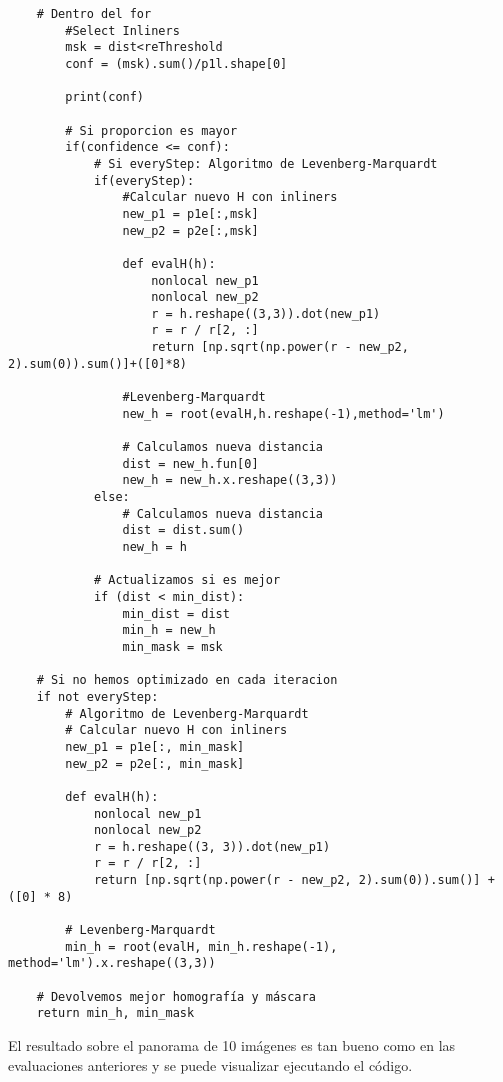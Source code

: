 \documentclass{article}
\begin{document}
\begin{lstlisting}
    # Dentro del for
        #Select Inliners
        msk = dist<reThreshold
        conf = (msk).sum()/p1l.shape[0]

        print(conf)

        # Si proporcion es mayor
        if(confidence <= conf):
            # Si everyStep: Algoritmo de Levenberg-Marquardt
            if(everyStep):
                #Calcular nuevo H con inliners
                new_p1 = p1e[:,msk]
                new_p2 = p2e[:,msk]

                def evalH(h):
                    nonlocal new_p1
                    nonlocal new_p2
                    r = h.reshape((3,3)).dot(new_p1)
                    r = r / r[2, :]
                    return [np.sqrt(np.power(r - new_p2, 2).sum(0)).sum()]+([0]*8)
                    
                #Levenberg-Marquardt
                new_h = root(evalH,h.reshape(-1),method='lm')
                
                # Calculamos nueva distancia
                dist = new_h.fun[0]
                new_h = new_h.x.reshape((3,3))
            else:
                # Calculamos nueva distancia
                dist = dist.sum()
                new_h = h
                
            # Actualizamos si es mejor
            if (dist < min_dist):
                min_dist = dist
                min_h = new_h
                min_mask = msk
                
    # Si no hemos optimizado en cada iteracion            
    if not everyStep:
        # Algoritmo de Levenberg-Marquardt
        # Calcular nuevo H con inliners
        new_p1 = p1e[:, min_mask]
        new_p2 = p2e[:, min_mask]

        def evalH(h):
            nonlocal new_p1
            nonlocal new_p2
            r = h.reshape((3, 3)).dot(new_p1)
            r = r / r[2, :]
            return [np.sqrt(np.power(r - new_p2, 2).sum(0)).sum()] + ([0] * 8)

        # Levenberg-Marquardt
        min_h = root(evalH, min_h.reshape(-1), method='lm').x.reshape((3,3))

    # Devolvemos mejor homografía y máscara
    return min_h, min_mask
\end{lstlisting}

El resultado sobre el panorama de 10 imágenes es tan bueno como en las evaluaciones anteriores y se puede visualizar ejecutando el código.
\end{document}

